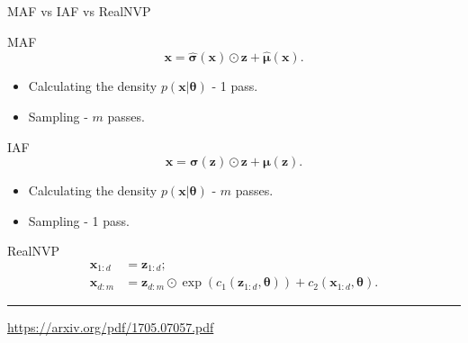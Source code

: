 \documentclass{beamer}
\newcommand{\bx}{\mathbf{x}}
\newcommand{\bz}{\mathbf{z}}
\newcommand{\bmu}{\boldsymbol{\mu}}
\newcommand{\bsigma}{\boldsymbol{\sigma}}
\newcommand{\btheta}{\boldsymbol{\theta}}
\begin{document}
\begin{frame}{MAF vs IAF vs RealNVP}
	\begin{block}{MAF}
		\vspace{-0.3cm}
		\[
		\bx = \hat{\bsigma} (\bx) \odot \bz + \hat{\bmu}(\bx).
		\]
		\vspace{-0.5cm}
		\begin{itemize}
			\item Calculating the density $p(\bx | \btheta)$ - 1 pass.
			\item Sampling - $m$ passes.
		\end{itemize}
	\end{block}
	\begin{block}{IAF}
		\vspace{-0.3cm}
		\[
		\bx = \bsigma (\bz) \odot \bz + \bmu(\bz).
		\]
		\vspace{-0.5cm}
		\begin{itemize}
			\item Calculating the density $p(\bx | \btheta)$ - $m$ passes.
			\item Sampling - 1 pass.
		\end{itemize}
	\end{block}
	\begin{block}{RealNVP}
		\vspace{-1cm}
		\begin{align*}
			\bx_{1:d} &= \bz_{1:d}; \\ \bx_{d:m} &= \bz_{d:m} \odot \exp \left(c_1(\bz_{1:d}, \btheta)\right) + c_2(\bx_{1:d}, \btheta).
		\end{align*}
		\vspace{-0.3cm}
	\end{block}
	
	\vfill
	\hrule\medskip
	{\scriptsize \href{https://arxiv.org/pdf/1705.07057.pdf}{https://arxiv.org/pdf/1705.07057.pdf}} 
\end{frame}
\end{document}
